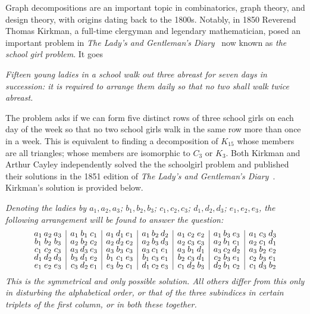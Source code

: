 \newpage Graph decompositions are an important topic in combinatorics, graph theory, and design theory, with origins dating back to the 1800s. Notably, in 1850 Reverend Thomas Kirkman, a full-time clergyman and legendary mathematician, posed an important problem in \textit{The Lady's and Gentleman's Diary}~\cite{Kirkman1850} now known as \textit{the school girl problem}. It goes

\begin{center}
\begin{minipage}{0.7\textwidth}
  \centering\itshape
  Fifteen young ladies in a school walk out three abreast for seven days in succession: it is required to arrange them daily so that no two shall walk twice abreast.
\end{minipage}
\end{center}

The problem asks if we can form five distinct rows of three school girls on each day of the week so that no two school girls walk in the same row more than once in a week. This is equivalent to finding a decomposition of $K_{15}$ whose members are all triangles; whose members are isomorphic to $C_{3}$ or $K_{3}$. Both Kirkman and Arthur Cayley independently solved the the schoolgirl problem and published their solutions in the 1851 edition of \textit{The Lady's and Gentleman's Diary}~\cite{Kirkman1851}. Kirkman's solution is provided below.

  \vspace{1em}
  \itshape
  \noindent Denoting the ladies by $a_1, a_2, a_3$; $b_1, b_2, b_3$; $c_1, c_2, c_3$; $d_1, d_2, d_3$; $e_1, e_2, e_3$, the following arrangement will be found to answer the question:
\[
\renewcommand{\arraystretch}{0.7}
\begin{array}{
  @{}c@{\hskip 2pt}c@{\hskip 2pt}c
  |c@{\hskip 2pt}c@{\hskip 2pt}c
  |c@{\hskip 2pt}c@{\hskip 2pt}c
  |c@{\hskip 2pt}c@{\hskip 2pt}c
  |c@{\hskip 2pt}c@{\hskip 2pt}c
  |c@{\hskip 2pt}c@{\hskip 2pt}c
  |c@{\hskip 2pt}c@{\hskip 2pt}c@{}}
a_1 & a_2 & a_3 & a_1 & b_1 & c_1 & a_1 & d_1 & e_1 & a_1 & b_2 & d_2 & a_1 & c_2 & e_2 & a_1 & b_3 & e_3 & a_1 & c_3 & d_3 \\
b_1 & b_2 & b_3 & a_2 & b_2 & c_2 & a_2 & d_2 & e_2 & a_2 & b_3 & d_3 & a_2 & c_3 & e_3 & a_2 & b_1 & e_1 & a_2 & c_1 & d_1 \\
c_1 & c_2 & c_3 & a_3 & d_3 & e_3 & a_3 & b_3 & c_3 & a_3 & c_1 & e_1 & a_3 & b_1 & d_1 & a_3 & c_2 & d_2 & a_3 & b_2 & e_2 \\
d_1 & d_2 & d_3 & b_3 & d_1 & e_2 & b_1 & c_1 & e_3 & b_1 & c_3 & e_1 & b_2 & c_3 & d_1 & c_2 & b_3 & e_1 & c_2 & b_3 & e_1 \\
e_1 & e_2 & e_3 & c_3 & d_2 & e_1 & e_3 & b_2 & c_1 & d_1 & c_2 & e_3 & c_1 & d_2 & b_3 & d_2 & b_1 & c_2 & c_1 & d_3 & b_2 \\
\end{array}
\]
\noindent This is the symmetrical and only possible solution. All others differ from this only in disturbing the alphabetical order, or that of the three subindices in certain triplets of the first column, or in both these together.\newline

